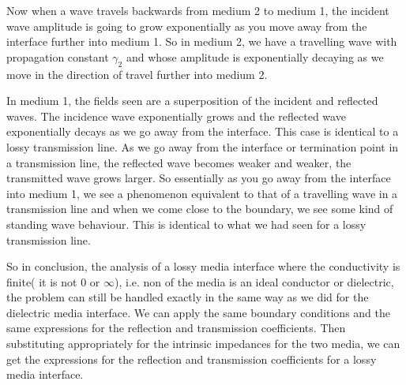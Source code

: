 Now when a wave travels backwards from medium 2 to medium 1, the incident wave amplitude is going to grow exponentially as you move away from the interface further into medium 1. So in medium 2, we have a travelling wave with propagation constant $\gamma_2$ and whose amplitude is exponentially decaying as we move in the direction of travel further into medium 2.

In medium 1, the fields seen are a superposition of the incident and reflected waves. The incidence wave exponentially grows and the reflected wave exponentially decays as we go away from the interface. This case is identical to a lossy transmission line. As we go away from the interface or termination point in a transmission line, the reflected wave becomes weaker and weaker, the transmitted wave grows larger. So essentially as you go away from the interface into medium 1, we see a phenomenon equivalent to that of a travelling wave in a transmission line and when we come close to the boundary, we see some kind of standing wave behaviour. This is identical to what we had seen for a lossy transmission line.

So in conclusion, the analysis of a lossy media interface where the conductivity is finite( it is not 0 or $\infty$), i.e. non of the media is an ideal conductor or dielectric, the problem can still be handled exactly in the same way as we did for the dielectric media interface. We can apply the same boundary conditions and the same expressions for the reflection and transmission coefficients. Then substituting appropriately for the intrinsic impedances for the two media, we can get the expressions for the reflection and transmission coefficients for a lossy media interface. 



